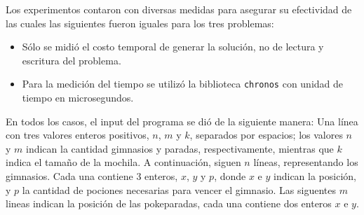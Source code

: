 Los experimentos contaron con diversas medidas para asegurar su efectividad de
las cuales las siguientes fueron iguales para los tres problemas:
\begin{itemize}
	\item{Sólo se midió el costo temporal de generar la solución, no
			de lectura y escritura del problema.}
	\item{Para la medición del tiempo se utilizó la biblioteca \texttt{chronos}
			con unidad de tiempo en microsegundos.}
\end{itemize}


En todos los casos, el input del programa se dió de la siguiente manera:
Una línea con tres valores enteros positivos, $n$, $m$ y $k$, separados por espacios; los valores $n$ y $m$ indican la cantidad gimnasios y paradas, respectivamente, mientras que $k$ indica el tamaño de la mochila. A continuación, siguen $n$ líneas, representando los gimnasios. Cada una contiene 3 enteros, $x$, $y$ y $p$, donde $x$ e $y$ indican la posición, y $p$ la cantidad de pociones necesarias para vencer el gimnasio. Las siguentes $m$ lineas indican la posición de las pokeparadas, cada una contiene dos enteros $x$ e $y$.